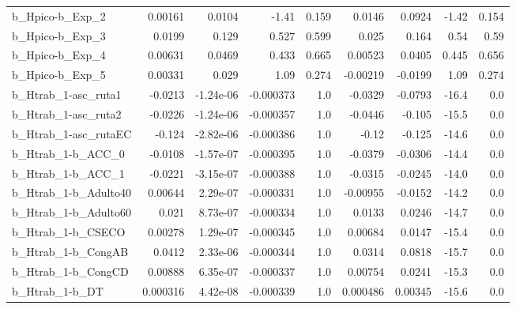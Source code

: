\begin{tabular}{lrrrrrrrr}
b\_Hpico-b\_Exp\_2            &     0.00161 &       0.0104 &     -1.41 &    0.159 &     0.0146 &      0.0924 &        -1.42 &         0.154 \\
b\_Hpico-b\_Exp\_3            &      0.0199 &        0.129 &     0.527 &    0.599 &      0.025 &       0.164 &         0.54 &          0.59 \\
b\_Hpico-b\_Exp\_4            &     0.00631 &       0.0469 &     0.433 &    0.665 &    0.00523 &      0.0405 &        0.445 &         0.656 \\
b\_Hpico-b\_Exp\_5            &     0.00331 &        0.029 &      1.09 &    0.274 &   -0.00219 &     -0.0199 &         1.09 &         0.274 \\
b\_Htrab\_1-asc\_ruta1        &     -0.0213 &    -1.24e-06 & -0.000373 &      1.0 &    -0.0329 &     -0.0793 &        -16.4 &           0.0 \\
b\_Htrab\_1-asc\_ruta2        &     -0.0226 &    -1.24e-06 & -0.000357 &      1.0 &    -0.0446 &      -0.105 &        -15.5 &           0.0 \\
b\_Htrab\_1-asc\_rutaEC       &      -0.124 &    -2.82e-06 & -0.000386 &      1.0 &      -0.12 &      -0.125 &        -14.6 &           0.0 \\
b\_Htrab\_1-b\_ACC\_0          &     -0.0108 &    -1.57e-07 & -0.000395 &      1.0 &    -0.0379 &     -0.0306 &        -14.4 &           0.0 \\
b\_Htrab\_1-b\_ACC\_1          &     -0.0221 &    -3.15e-07 & -0.000388 &      1.0 &    -0.0315 &     -0.0245 &        -14.0 &           0.0 \\
b\_Htrab\_1-b\_Adulto40       &     0.00644 &     2.29e-07 & -0.000331 &      1.0 &   -0.00955 &     -0.0152 &        -14.2 &           0.0 \\
b\_Htrab\_1-b\_Adulto60       &       0.021 &     8.73e-07 & -0.000334 &      1.0 &     0.0133 &      0.0246 &        -14.7 &           0.0 \\
b\_Htrab\_1-b\_CSECO          &     0.00278 &     1.29e-07 & -0.000345 &      1.0 &    0.00684 &      0.0147 &        -15.4 &           0.0 \\
b\_Htrab\_1-b\_CongAB         &      0.0412 &     2.33e-06 & -0.000344 &      1.0 &     0.0314 &      0.0818 &        -15.7 &           0.0 \\
b\_Htrab\_1-b\_CongCD         &     0.00888 &     6.35e-07 & -0.000337 &      1.0 &    0.00754 &      0.0241 &        -15.3 &           0.0 \\
b\_Htrab\_1-b\_DT             &    0.000316 &     4.42e-08 & -0.000339 &      1.0 &   0.000486 &     0.00345 &        -15.6 &           0.0 \\

\end{tabular}
